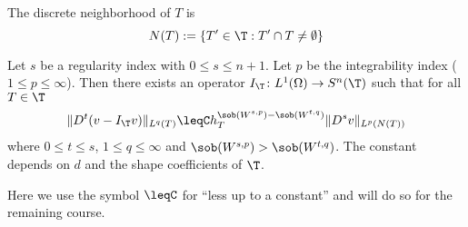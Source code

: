\begin{definition}
	The discrete neighborhood of $T$ is
	\begin{equation*}
		N(T):= \left\{ T' \in \T : T'\cap T \neq \emptyset \right\}
	\end{equation*}
\end{definition}
\begin{theorem}\enter
	Let $s$ be a regularity index with $0 \leq s \leq n+1$.
	Let $p$ be the integrability index ($1 \leq p \leq \infty$).
	Then there exists an operator $I_{\T}\colon L^1(\Omega) \to S^n(\T)$ such that for all $T \in \T$
	\begin{equation*}
    \|D^t(v - I_{\T}v)\|_{L^{q}(T)} \leqC h_{T}^{\sob(W^{s,p})-\sob(W^{t,q})} \|D^s v\|_{L^{p}(N(T))}
	\end{equation*}
	where $0 \leq t \leq s$, $1 \leq q\leq \infty$ and $\sob(W^{s,p}) > \sob(W^{t,q})$.
	The constant depends on $d$ and the shape coefficients of $\T$.
\end{theorem}
Here we use the symbol $\leqC$ for \enquote{less up to a constant} and
will do so for the remaining course.
